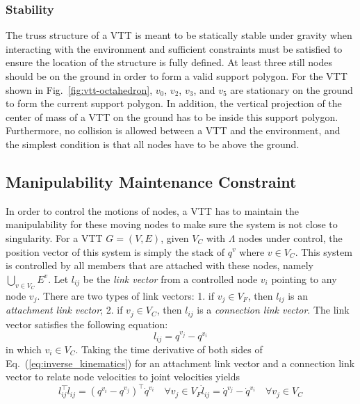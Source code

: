 \documentclass[journal]{IEEEtran}
\begin{document}
\subsubsection{Stability}
\label{sec:com}

The truss structure of a VTT is meant to be statically stable under
gravity when interacting with the environment and sufficient
constraints must be satisfied to ensure the location of the structure
is fully defined. At least three still nodes should be on the ground
in order to form a valid support polygon. For the VTT shown in
Fig.~\ref{fig:vtt-octahedron}, $v_0$, $v_2$, $v_3$, and $v_5$ are
stationary on the ground to form the current support polygon. In
addition, the vertical projection of the center of mass of a VTT on
the ground has to be inside this support polygon. Furthermore, no
collision is allowed between a VTT and the environment, and the
simplest condition is that all nodes have to be above the ground.

\subsection{Manipulability Maintenance Constraint}
\label{sec:manipulability}

In order to control the motions of nodes, a VTT has to maintain the
manipulability for these moving nodes to make sure the system is not
close to singularity. For a VTT $G=(V,E)$, given $V_C$ with $\Lambda$
nodes under control, the position vector of this system is simply the
stack of $q^v$ where $v\in V_C$. This system is controlled by all
members that are attached with these nodes, namely
$\bigcup_{v\in V_C} E^v$. Let $l_{ij}$ be the \textit{link vector}
from a controlled node $v_i$ pointing to any node $v_j$. There are two
types of link vectors: 1. if $v_j\in V_F$, then $l_{ij}$ is an
\textit{attachment link vector}; 2. if $v_j\in V_C$, then $l_{ij}$ is
a \textit{connection link vector}. The link vector satisfies the
following equation:
\begin{equation}
  \label{eq:inverse_kinematics}
  l_{ij} = q^{v_j} - q^{v_i}
\end{equation}
in which $v_i\in V_C$.  Taking the time derivative of both sides of
Eq.~(\ref{eq:inverse_kinematics}) for an attachment link vector and a
connection link vector to relate node velocities to joint velocities
yields
\begin{subequations}
  \begin{equation}
    \label{eq:derivative-eq-1}
    l_{ij}^\intercal\dot{l}_{ij} = (q^{v_i} - q^{v_j})^{\intercal}\dot{q}^{v_i}\quad \forall
    v_j\in V_F
  \end{equation}
  \begin{equation}
    \label{eq:derivative-eq-2}
    \dot{l}_{ij} = \dot{q}^{v_j} - \dot{q}^{v_i}\quad \forall v_j\in V_C
  \end{equation}
\end{subequations}
\end{document}
